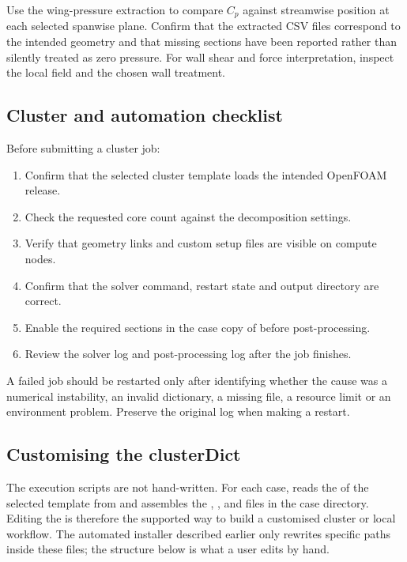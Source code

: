 Use the wing-pressure extraction to compare $C_p$ against streamwise position at each selected spanwise plane. Confirm that the extracted CSV files correspond to the intended geometry and that missing sections have been reported rather than silently treated as zero pressure. For wall shear and force interpretation, inspect the local  field and the chosen wall treatment.

\subsection{Cluster and automation checklist}

Before submitting a cluster job:
\begin{enumerate}
    \item Confirm that the selected cluster template loads the intended OpenFOAM release.
    \item Check the requested core count against the decomposition settings.
    \item Verify that geometry links and custom setup files are visible on compute nodes.
    \item Confirm that the solver command, restart state and output directory are correct.
    \item Enable the required sections in the case copy of  before post-processing.
    \item Review the solver log and post-processing log after the job finishes.
\end{enumerate}

A failed job should be restarted only after identifying whether the cause was a numerical instability, an invalid dictionary, a missing file, a resource limit or an environment problem. Preserve the original log when making a restart.

\subsection{Customising the clusterDict}

The execution scripts are not hand-written. For each case,  reads the  of the selected template from  and assembles the , ,  and  files in the case directory. Editing the  is therefore the supported way to build a customised cluster or local workflow. The automated installer described earlier only rewrites specific paths inside these files; the structure below is what a user edits by hand.

